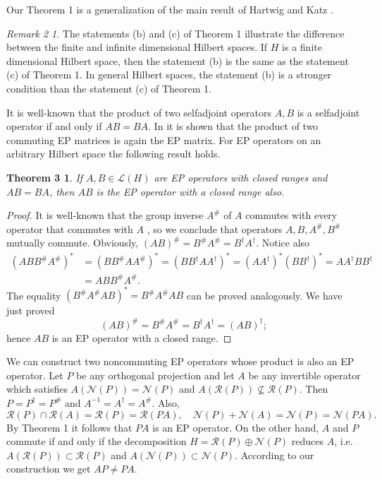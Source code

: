 \documentclass{proc-l}
\theoremstyle{plain}
\newtheorem*{theorem2}{Theorem 3}
\theoremstyle{remark}
\newtheorem*{remark1}{Remark 2}
\theoremstyle{definition}
\begin{document}
Our Theorem 1 is a generalization of the main result of Hartwig and Katz %
\cite{5}.

\begin{remark1}
The statements (b) and (c) of Theorem 1 illustrate the difference between
the finite and infinite dimensional Hilbert spaces. If $H$ is a finite
dimensional Hilbert space, then the statement (b) is the same as the
statement (c) of Theorem 1. In general Hilbert spaces, the statement (b) is
a stronger condition than the statement (c) of Theorem 1.
\end{remark1}

It is well-known that the product of two selfadjoint operators $A,B$ is a
selfadjoint operator if and only if $AB=BA$. In \cite{6} it is shown that
the product of two commuting EP matrices is again the EP matrix. For EP
operators on an arbitrary Hilbert space the following result holds.

\begin{theorem2}
If $A,B\in \mathcal{L} (H)$ are EP operators with closed ranges and $AB=BA$,
then $AB$ is the EP operator with a closed range also.
\end{theorem2}

\begin{proof} It is well-known that the group inverse $A^{\#}$ of $A$
 commutes with every operator that commutes with $A$ \cite{4}, so
we conclude that operators $A,B, A^{\#}, B^{\#}$ mutually commute.
Obviously, $(AB)^{\#}=B^{\#}A^{\#}=B^{\dag }A^{\dag }$. Notice also
\begin{equation*}\begin{split}
(ABB^{\#}A^{\#})^{*}&=(BB^{\#}AA^{\#})^{*}=(BB^{\dag }AA^{\dag 
})^{*}=(AA^{\dag })^{*}(BB^{\dag })^{*}=AA^{\dag }BB^{\dag }\\
&=ABB^{\#} A^{\#}.
\end{split}\end{equation*}
The equality $(B^{\#}A^{\#} AB)^{*}=B^{\#}A^{\#} AB$ can be proved 
analogously. We
have just proved
\begin{equation*}(AB)^{\#}=B^{\#}A^{\#}=B^{\dag }A^{\dag }=(AB)^{\dag 
};\end{equation*}
hence $AB$ is an EP operator with a closed range.\end{proof}

We can construct two noncommuting EP operators whose product is also an EP
operator. Let $P$ be any orthogonal projection and let $A$ be any invertible
operator which satisfies $A(\mathcal{N} (P))=\mathcal{N} (P)$ and $A(%
\mathcal{R} (P))\nsubseteq \mathcal{R} (P)$. Then $P=P^{\dag }=P^{\#}$ and $%
A^{-1}=A^{\dag }=A^{\#}$. Also, 
\begin{equation*}
\mathcal{R} (P)\cap \mathcal{R} (A)=\mathcal{R} (P)=\mathcal{R} (PA),\quad 
\mathcal{N} (P)+\mathcal{N} (A)=\mathcal{N} (P)=\mathcal{N} (PA).
\end{equation*}
By Theorem 1 it follows that $PA$ is an EP operator. On the other hand, $A$
and $P$ commute if and only if the decomposition $H=\mathcal{R} (P)\oplus 
\mathcal{N} (P)$ reduces $A$, i.e. $A(\mathcal{R} (P))\subset\mathcal{R} (P)$
and $A(\mathcal{N} (P))\subset\mathcal{N} (P)$. According to our
construction we get $AP\neq PA$.
\end{document}
